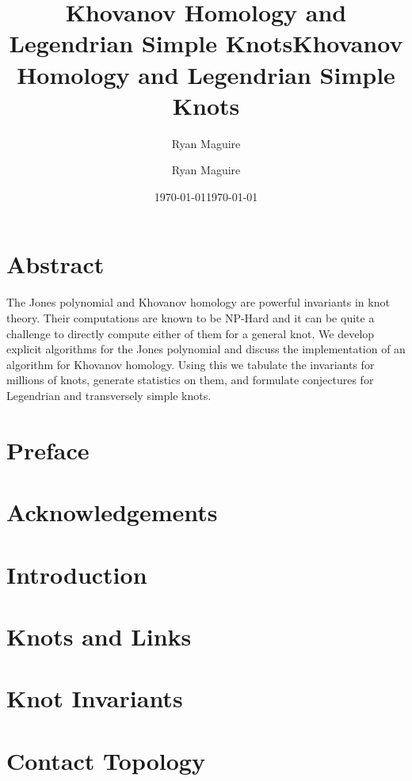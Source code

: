\documentclass{dcthesis}
\title{Khovanov Homology and Legendrian Simple Knots}
\author{Ryan Maguire}
\date{\today}
\title{Khovanov Homology and Legendrian Simple Knots}
\author{Ryan Maguire}
\date{\today}
\theoremstyle{plain}
\theoremstyle{normal}
\begin{document}
    \frontmatter
    \maketitle
    \chapter*{Abstract}
        The Jones polynomial and Khovanov homology are powerful invariants
        in knot theory. Their computations are known to be NP-Hard and it
        can be quite a challenge to directly compute either of them for a
        general knot. We develop explicit algorithms for the Jones polynomial
        and discuss the implementation of an algorithm for Khovanov homology.
        Using this we tabulate the invariants for millions of knots, generate
        statistics on them, and formulate conjectures for Legendrian and
        transversely simple knots.
    \chapter*{Preface}
        
    \chapter*{Acknowledgements}
        
    \tableofcontents
    \listoftables
    \listoffigures
    \mainmatter
    \chapter{Introduction}
        
    \chapter{Knots and Links}
        
        
        
        
    \chapter{Knot Invariants}
        
        
        
        
        
    \chapter{Contact Topology}
        
        
        
        
\end{document}
